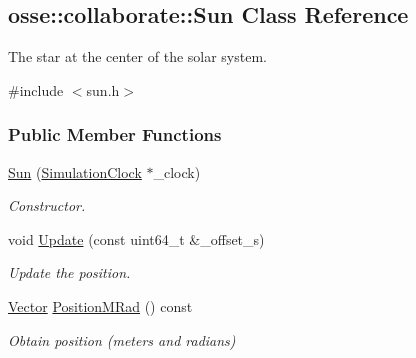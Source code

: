 \hypertarget{classosse_1_1collaborate_1_1_sun}{}\subsection{osse\+:\+:collaborate\+:\+:Sun Class Reference}
\label{classosse_1_1collaborate_1_1_sun}


The star at the center of the solar system.  




{\ttfamily \#include $<$sun.\+h$>$}

\subsubsection*{Public Member Functions}
\begin{DoxyCompactItemize}
\item 
\hyperlink{classosse_1_1collaborate_1_1_sun_a0fee2016c313072585008c22361d5e64}{Sun} (\hyperlink{classosse_1_1collaborate_1_1_simulation_clock}{Simulation\+Clock} $\ast$\+\_\+clock)
\begin{DoxyCompactList}\small\item\em Constructor. \end{DoxyCompactList}\item 
void \hyperlink{classosse_1_1collaborate_1_1_sun_a917e9e3cce61142249bb53157a299b09}{Update} (const uint64\+\_\+t \&\+\_\+offset\+\_\+s)
\begin{DoxyCompactList}\small\item\em Update the position. \end{DoxyCompactList}\item 
\hyperlink{classosse_1_1collaborate_1_1_vector}{Vector} \hyperlink{classosse_1_1collaborate_1_1_sun_aa1daaa3502398464ce590981c9c9764e}{Position\+M\+Rad} () const
\begin{DoxyCompactList}\small\item\em Obtain position (meters and radians) \end{DoxyCompactList}\end{DoxyCompactItemize}
